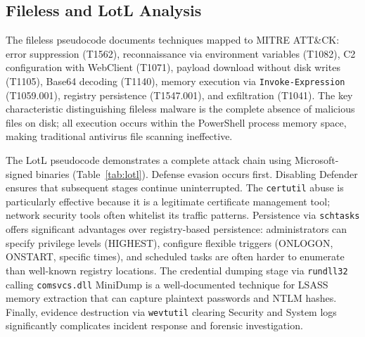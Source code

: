 \documentclass[sigconf]{acmart}
\begin{document}

\subsection{Fileless and LotL Analysis}

\vspace{0.5em}
\qquad The fileless pseudocode documents techniques mapped to MITRE ATT\&CK: error suppression (T1562), reconnaissance via environment variables (T1082), C2 configuration with WebClient (T1071), payload download without disk writes (T1105), Base64 decoding (T1140), memory execution via \texttt{Invoke-Expression} (T1059.001), registry persistence (T1547.001), and exfiltration (T1041). The key characteristic distinguishing fileless malware is the complete absence of malicious files on disk; all execution occurs within the PowerShell process memory space, making traditional antivirus file scanning ineffective.

\qquad The LotL pseudocode demonstrates a complete attack chain using Microsoft-signed binaries (Table~\ref{tab:lotl}). Defense evasion occurs first. Disabling Defender ensures that subsequent stages continue uninterrupted. The \texttt{certutil} abuse is particularly effective because it is a legitimate certificate management tool; network security tools often whitelist its traffic patterns. Persistence via \texttt{schtasks} offers significant advantages over registry-based persistence: administrators can specify privilege levels (HIGHEST), configure flexible triggers (ONLOGON, ONSTART, specific times), and scheduled tasks are often harder to enumerate than well-known registry locations. The credential dumping stage via \texttt{rundll32} calling \texttt{comsvcs.dll} MiniDump is a well-documented technique for LSASS memory extraction that can capture plaintext passwords and NTLM hashes. Finally, evidence destruction via \texttt{wevtutil} clearing Security and System logs significantly complicates incident response and forensic investigation.
\end{document}
